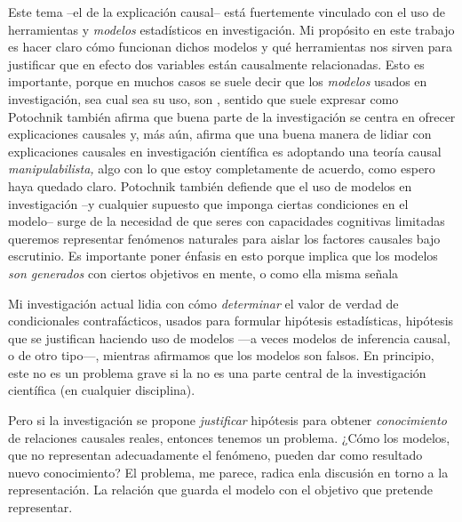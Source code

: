 Este tema --el de la explicación causal-- está fuertemente vinculado
con el uso de herramientas y \emph{modelos} estadísticos en
investigación. Mi propósito en este trabajo es hacer claro cómo
funcionan dichos modelos y qué herramientas nos sirven para
justificar que en efecto dos variables están causalmente
relacionadas. Esto es importante, porque en muchos casos se suele
decir que los \emph{modelos} usados en investigación, sea cual sea su
uso, son , sentido que suele expresar como
 \parencite[p.~18, énfasis
	agregado]{Potochnik2017-POTIAT-3} Potochnik también afirma que buena
parte de la investigación se centra en ofrecer explicaciones causales
y, más aún, afirma que una buena manera de lidiar con explicaciones
causales en investigación científica es adoptando una teoría causal
\emph{manipulabilista,} algo con lo que estoy completamente de
acuerdo, como espero haya quedado claro. Potochnik también defiende
que el uso de modelos en investigación --y cualquier supuesto que
imponga ciertas condiciones en el modelo-- surge de la necesidad de
que seres con capacidades cognitivas limitadas queremos representar
fenómenos naturales para aislar los factores causales bajo
escrutinio. Es importante poner énfasis en esto porque implica que
los modelos \emph{son generados} con ciertos objetivos en mente, o
como ella misma señala 

Mi investigación actual lidia con cómo \emph{determinar} el valor de
verdad de condicionales contrafácticos, usados para formular
hipótesis estadísticas, hipótesis que se justifican haciendo uso de
modelos ---a veces modelos de inferencia causal, o de otro tipo---,
mientras afirmamos que los modelos son falsos. En principio, este no
es un problema grave si la  no es una parte central de la
investigación científica (en cualquier disciplina).

Pero si la investigación se propone \emph{justificar} hipótesis para
obtener \emph{conocimiento} de relaciones causales reales, entonces
tenemos un problema. ¿Cómo los modelos, que no representan
adecuadamente el fenómeno, pueden dar como resultado nuevo
conocimiento? El problema, me parece, radica enla discusión en torno
a la representación. La relación que guarda el modelo con el objetivo
que pretende representar.


